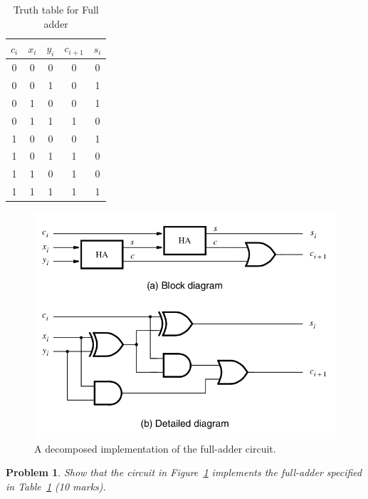 \documentclass[twocolumn]{article}
\newtheorem{prob}{Problem}
\begin{document}
\begin{table}
  \centering
  \begin{tabular}{ccc|c|c}
    \toprule
    $c_i$ & $x_i$ & $y_i$ & $c_{i+1}$ & $s_i$ \\
    \midrule
    0 & 0 & 0 & 0 & 0 \\
    0 & 0 & 1 & 0 & 1 \\
    0 & 1 & 0 & 0 & 1 \\
    0 & 1 & 1 & 1 & 0 \\
    1 & 0 & 0 & 0 & 1 \\
    1 & 0 & 1 & 1 & 0 \\
    1 & 1 & 0 & 1 & 0 \\
    1 & 1 & 1 & 1 & 1 \\
    \bottomrule
    \end{tabular}
  \caption{Truth table for Full adder}
  \label{tab:full-adder}
\end{table}

\begin{figure}
\includegraphics[width=\linewidth]{fig-3.4.png}
\caption{A decomposed implementation of the full-adder circuit.}
\label{fig:decomposed-full-adder}
\end{figure}

\begin{prob}
  Show that the circuit in Figure~\ref{fig:decomposed-full-adder} implements the
  full-adder specified in Table~\ref{tab:full-adder} (10 marks).
\end{prob}


%
%
\end{document}
